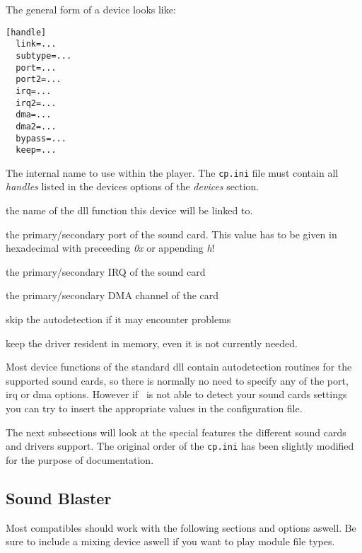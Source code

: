 The general form of a device looks like:
\begin{verbatim}
[handle]
  link=...                                  
  subtype=...                               
  port=...                                  
  port2=...                                 
  irq=...                                   
  irq2=...                                  
  dma=...                                   
  dma2=...                                  
  bypass=...                                
  keep=...                                  
\end{verbatim}

\begin{dojlist}
\item[handle] The internal name to use within the player. The \texttt{cp.ini}
file must contain all \emph{handles} listed in the devices options of
the
\emph{devices} section.
\item[link] the name of the dll function this device will be linked to.
\item[port(2)] the primary/secondary port of the sound card. This value has to
be given in hexadecimal with preceeding \emph{0x} or appending \emph{h}!
\item[irq(2)] the primary/secondary IRQ of the sound card
\item[dma(2)] the primary/secondary DMA channel of the card
\item[bypass] skip the autodetection if it may encounter problems
\item[keep] keep the driver resident in memory, even it is not currently 
needed.
\end{dojlist}

Most device functions of the standard dll contain autodetection
routines for the supported sound cards, so there is normally no need
to specify any of the port, irq or dma options. However if \cp\ is not
able to detect your sound cards settings you can try to insert the
appropriate values in the configuration file.

The next subsections will look at the special features the different
sound cards and drivers support. The original order of the
\texttt{cp.ini} has been slightly modified for the purpose of
documentation.

\subsection{Sound Blaster}
Most compatibles should work with the following sections and options
aswell.  Be sure to include a mixing device aswell if you want to play
module file types.

